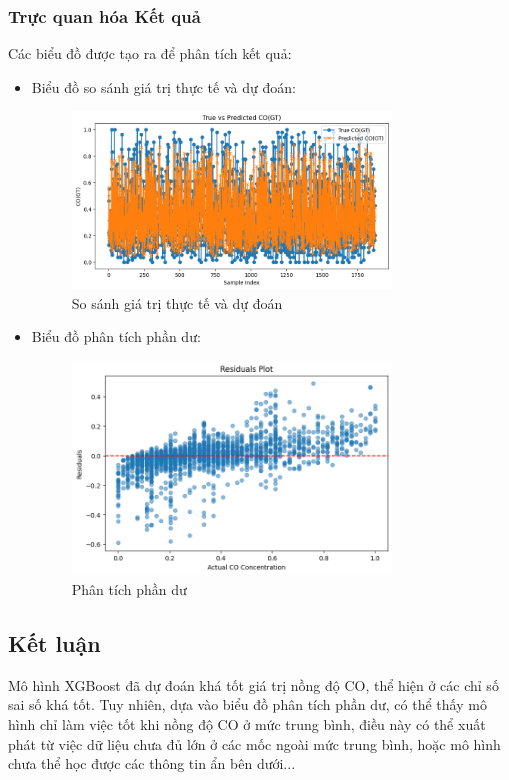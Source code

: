 \subsubsection{Trực quan hóa Kết quả}
Các biểu đồ được tạo ra để phân tích kết quả:
\begin{itemize}
    \item Biểu đồ so sánh giá trị thực tế và dự đoán:
    \begin{figure}[h]
        \centering
        \includegraphics[width=0.8\textwidth]{images/xgboost/xgboost_true&predict.png}
        \caption{So sánh giá trị thực tế và dự đoán}
        \label{fig:xgboost_predictions}
    \end{figure}
    
    \item Biểu đồ phân tích phần dư:
    \begin{figure}[h]
        \centering
        \includegraphics[width=0.8\textwidth]{images/xgboost/xgboost_residuals.png}
        \caption{Phân tích phần dư}
        \label{fig:xgboost_residuals}
    \end{figure}
\end{itemize}

\subsection{Kết luận}
Mô hình XGBoost đã dự đoán khá tốt giá trị nồng độ CO, thể hiện ở các chỉ số sai số khá tốt. Tuy nhiên, dựa vào biểu đồ phân tích phần dư, có thể thấy mô hình chỉ làm việc tốt khi nồng độ CO ở mức trung bình, điều này có thể xuất phát từ việc dữ liệu chưa đủ lớn ở các mốc ngoài mức trung bình, hoặc mô hình chưa thể học được các thông tin ẩn bên dưới...